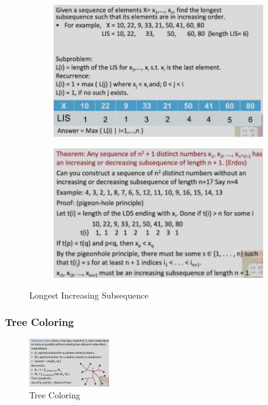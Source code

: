 \begin{figure}[H]
    \centering
    \begin{subfigure}{0.309\textwidth}
        \centering
        \includegraphics[width=\textwidth]{pic/DAA8/Longest Increasing Subsequence}
    \end{subfigure}
    \begin{subfigure}{0.309\textwidth}
        \centering
        \includegraphics[width=\textwidth]{pic/DAA8/Longest Increasing Subsequence1}
    \end{subfigure}
    \caption{Longest Increasing Subsequence}
\end{figure}

\subsubsection{Tree Coloring}
\begin{figure}[H]
    \centering
    \includegraphics[width=0.309\textwidth]{pic/DAA8/Tree Coloring}
    \caption{Tree Coloring}
\end{figure}

